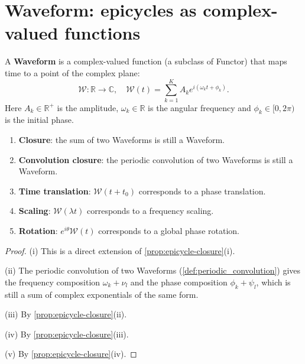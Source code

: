 \section{Waveform: epicycles as complex-valued functions}

\begin{definition}\label{def:waveform_definition}
A \textbf{Waveform} is a complex-valued function (a subclass of Functor) that maps time to a point of the complex plane:
\[
\mathcal{W}: \mathbb{R} \to \mathbb{C}, \quad \mathcal{W}(t) = \sum_{k=1}^{K} A_k e^{i(\omega_k t + \phi_k)}.
\]
Here $A_k \in \mathbb{R}^+$ is the amplitude, $\omega_k \in \mathbb{R}$ is the angular frequency and $\phi_k \in [0, 2\pi)$ is the initial phase.
\end{definition}

\begin{property}\label{prop:waveform_properties}
\begin{enumerate}[label=(\roman*)]
    \item \textbf{Closure}: the sum of two Waveforms is still a Waveform.
    \item \textbf{Convolution closure}: the periodic convolution of two Waveforms is still a Waveform.
    \item \textbf{Time translation}: $\mathcal{W}(t + t_0)$ corresponds to a phase translation.
    \item \textbf{Scaling}: $\mathcal{W}(\lambda t)$ corresponds to a frequency scaling.
    \item \textbf{Rotation}: $e^{i\theta} \mathcal{W}(t)$ corresponds to a global phase rotation.
\end{enumerate}
\end{property}

\begin{proof}
(i) This is a direct extension of \cref{prop:epicycle-closure}(i).

(ii) The periodic convolution of two Waveforms (\cref{def:periodic_convolution}) gives the frequency composition $\omega_k + \nu_l$ and the phase composition $\phi_k + \psi_l$, which is still a sum of complex exponentials of the same form.

(iii) By \cref{prop:epicycle-closure}(ii).

(iv) By \cref{prop:epicycle-closure}(iii).

(v) By \cref{prop:epicycle-closure}(iv).
\end{proof}

